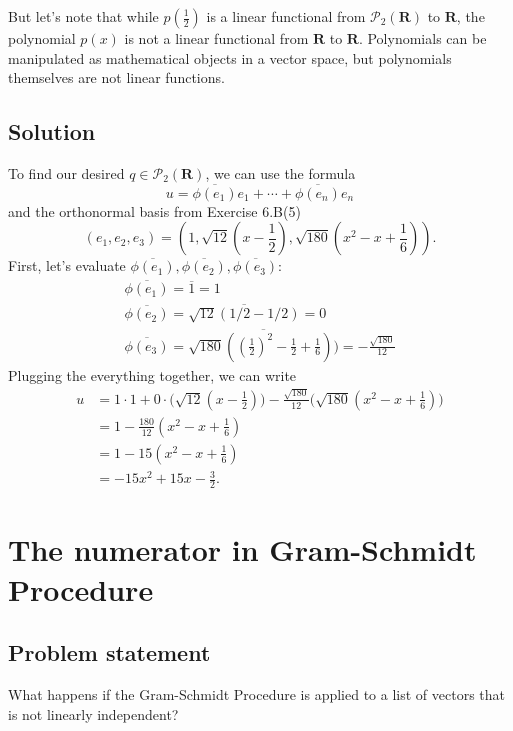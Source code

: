 \documentclass{article}
\begin{document}
But let's note that while $p(\frac{1}{2})$ is a linear functional from $\mathcal{P}_2(\mathbf{R})$ to $\mathbf{R}$, the polynomial $p(x)$ is not a linear functional from $\mathbf{R}$ to $\mathbf{R}$. 
Polynomials can be manipulated as mathematical objects in a vector space, but polynomials themselves are not linear functions.

\subsection*{Solution}
To find our desired $q\in\mathcal{P}_2(\mathbf{R})$, we can use the formula
\[u=\overline{\phi(e_1)}e_1+\cdots+\overline{\phi(e_n)}e_n\]
and the orthonormal basis from Exercise 6.B(5)
\[(e_1,e_2,e_3)=(1,\sqrt{12}(x-\frac{1}{2}),\sqrt{180}(x^2-x+\frac{1}{6})).\]
First, let's evaluate $\overline{\phi(e_1)},\overline{\phi(e_2)},\overline{\phi(e_3)}$:
\begin{gather*}
    \overline{\phi(e_1)}=\overline{1}=1\\
    \overline{\phi(e_2)}=\overline{\sqrt{12}(1/2-1/2)}=0\\
    \overline{\phi(e_3)}=\overline{\sqrt{180}((\frac{1}{2})^2-\frac{1}{2}+\frac{1}{6}))}=-\frac{\sqrt{180}}{12}
\end{gather*}
Plugging the everything together, we can write
\begin{align*}
    u&=1 \cdot 1+0\cdot\Big(\sqrt{12}(x-\frac{1}{2})\Big)-\frac{\sqrt{180}}{12}\Big( \sqrt{180}(x^2-x+\frac{1}{6})\Big)\\
    &=1-\frac{180}{12}(x^2-x+\frac{1}{6})\\
    &=1-15(x^2-x+\frac{1}{6})\\
    &=-15x^2+15x-\frac{3}{2}.
\end{align*}

\clearpage

\renewcommand{\thesection}{9}
\section{The numerator in Gram-Schmidt Procedure}
\subsection*{Problem statement}
What happens if the Gram-Schmidt Procedure is applied to a list of vectors that is not linearly independent?
\end{document}
